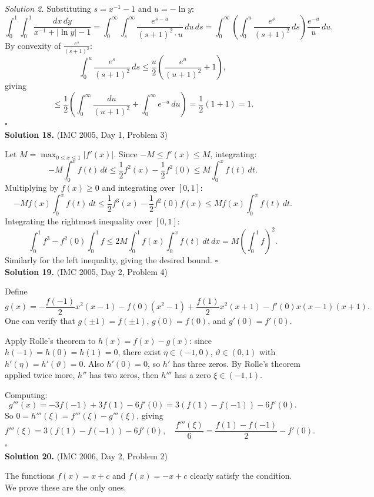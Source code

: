 \documentclass{article}
\begin{document}
\textit{Solution 2.} Substituting \( s = x^{-1} - 1 \) and \( u = -\ln y \):
\[
\int_0^1\int_0^1 \frac{dx\,dy}{x^{-1}+|\ln y|-1}
= \int_0^\infty\int_s^\infty \frac{e^{s-u}}{(s+1)^2 \cdot u}\,du\,ds
= \int_0^\infty \left(\int_0^u \frac{e^s}{(s+1)^2}\,ds\right)\frac{e^{-u}}{u}\,du.
\]
By convexity of \( \frac{e^s}{(s+1)^2} \):
\[
\int_0^u \frac{e^s}{(s+1)^2}\,ds \leq \frac{u}{2}\left(\frac{e^u}{(u+1)^2}+1\right),
\]
giving
\[
\leq \frac{1}{2}\left(\int_0^\infty \frac{du}{(u+1)^2} + \int_0^\infty e^{-u}\,du\right) = \frac{1}{2}(1+1) = 1.
\]
\hfill\(\square\)
\\

\textbf{Solution 18.} (IMC 2005, Day 1, Problem 3)

Let \( M = \max_{0 \leq x \leq 1} |f'(x)| \). Since \( -M \leq f'(x) \leq M \), integrating:
\[
-M\int_0^x f(t)\,dt \leq \frac{1}{2}f^2(x) - \frac{1}{2}f^2(0) \leq M\int_0^x f(t)\,dt.
\]
Multiplying by \( f(x) \geq 0 \) and integrating over \( [0,1] \):
\[
-Mf(x)\int_0^x f(t)\,dt \leq \frac{1}{2}f^3(x) - \frac{1}{2}f^2(0)f(x) \leq Mf(x)\int_0^x f(t)\,dt.
\]
Integrating the rightmost inequality over \( [0,1] \):
\[
\int_0^1 f^3 - f^2(0)\int_0^1 f \leq 2M\int_0^1 f(x)\int_0^x f(t)\,dt\,dx = M\left(\int_0^1 f\right)^2.
\]
Similarly for the left inequality, giving the desired bound. \hfill\(\square\)
\\

\textbf{Solution 19.} (IMC 2005, Day 2, Problem 4)

Define
\[
g(x) = -\frac{f(-1)}{2}x^2(x-1) - f(0)(x^2-1) + \frac{f(1)}{2}x^2(x+1) - f'(0)x(x-1)(x+1).
\]
One can verify that \( g(\pm 1) = f(\pm 1) \), \( g(0) = f(0) \), and \( g'(0) = f'(0) \).

Apply Rolle's theorem to \( h(x) = f(x) - g(x) \): since \( h(-1) = h(0) = h(1) = 0 \), there exist \( \eta \in (-1, 0) \), \( \vartheta \in (0,1) \) with \( h'(\eta) = h'(\vartheta) = 0 \). Also \( h'(0) = 0 \), so \( h' \) has three zeros. By Rolle's theorem applied twice more, \( h'' \) has two zeros, then \( h''' \) has a zero \( \xi \in (-1,1) \).

Computing:
\[
g'''(x) = -3f(-1) + 3f(1) - 6f'(0) = 3(f(1) - f(-1)) - 6f'(0).
\]
So \( 0 = h'''(\xi) = f'''(\xi) - g'''(\xi) \), giving
\[
f'''(\xi) = 3(f(1) - f(-1)) - 6f'(0), \quad \frac{f'''(\xi)}{6} = \frac{f(1) - f(-1)}{2} - f'(0).
\]
\hfill\(\square\)
\\

\textbf{Solution 20.} (IMC 2006, Day 2, Problem 2)

The functions \( f(x) = x + c \) and \( f(x) = -x + c \) clearly satisfy the condition. We prove these are the only ones.
\end{document}
